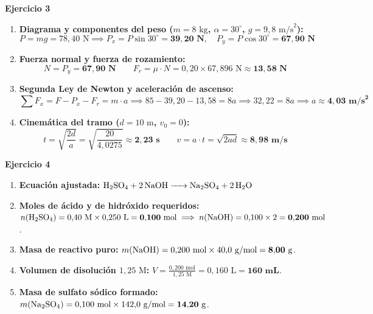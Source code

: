 \documentclass[11pt,a4paper]{article}
\begin{document}
\newpage

\noindent\textbf{Ejercicio 3}
\begin{enumerate}[label=\textbf{\alph*)}, leftmargin=2em, itemsep=6pt]
    \item \textbf{Diagrama y componentes del peso ($m = 8\text{ kg}$, $\alpha = 30^\circ$, $g = 9{,}8\text{ m/s}^2$):}
    \[
    P = m g = 78{,}40\text{ N} \implies P_x = P \sin 30^\circ = \mathbf{39{,}20\text{ N}}, \quad P_y = P \cos 30^\circ = \mathbf{67{,}90\text{ N}}
    \]
    \item \textbf{Fuerza normal y fuerza de rozamiento:}
    \[
    N = P_y = \mathbf{67{,}90\text{ N}} \qquad F_r = \mu \cdot N = 0{,}20 \times 67{,}896\text{ N} \approx \mathbf{13{,}58\text{ N}}
    \]
    \item \textbf{Segunda Ley de Newton y aceleración de ascenso:}
    \[
    \sum F_x = F - P_x - F_r = m \cdot a \implies 85 - 39{,}20 - 13{,}58 = 8 a \implies 32{,}22 = 8 a \implies a \approx \mathbf{4{,}03\text{ m/s}^2}
    \]
    \item \textbf{Cinemática del tramo ($d = 10\text{ m}$, $v_0 = 0$):}
    \[
    t = \sqrt{\frac{2d}{a}} = \sqrt{\frac{20}{4{,}0275}} \approx \mathbf{2{,}23\text{ s}} \qquad v = a \cdot t = \sqrt{2 a d} \approx \mathbf{8{,}98\text{ m/s}}
    \]
\end{enumerate}

\vspace{0.4cm}
\noindent\textbf{Ejercicio 4}
\begin{enumerate}[label=\textbf{\alph*)}, leftmargin=2em, itemsep=6pt]
    \item \textbf{Ecuación ajustada:} $\ce{H2SO4 + 2 NaOH -> Na2SO4 + 2 H2O}$
    \item \textbf{Moles de ácido y de hidróxido requeridos:}
    $n(\ce{H2SO4}) = 0{,}40\text{ M} \times 0{,}250\text{ L} = \mathbf{0{,}100\text{ mol}} \implies n(\ce{NaOH}) = 0{,}100 \times 2 = \mathbf{0{,}200\text{ mol}}$.
    \item \textbf{Masa de reactivo puro:} $m(\ce{NaOH}) = 0{,}200\text{ mol} \times 40{,}0\text{ g/mol} = \mathbf{8{,}00\text{ g}}$.
    \item \textbf{Volumen de disolución $1{,}25\text{ M}$:} $V = \frac{0{,}200\text{ mol}}{1{,}25\text{ M}} = 0{,}160\text{ L} = \mathbf{160\text{ mL}}$.
    \item \textbf{Masa de sulfato sódico formado:} $m(\ce{Na2SO4}) = 0{,}100\text{ mol} \times 142{,}0\text{ g/mol} = \mathbf{14{,}20\text{ g}}$.
\end{enumerate}
\end{document}
